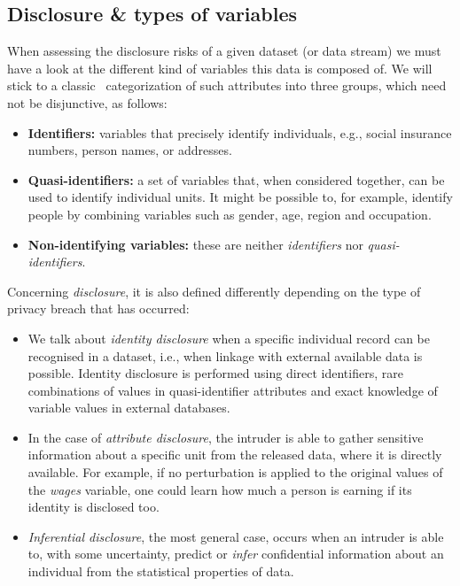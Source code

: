 \subsection{Disclosure \& types of variables}

When assessing the disclosure risks of a given dataset (or data stream) we must have a look at the different kind of variables this data is composed of. We will stick to a classic~\citep{Templ:IntroSDC} categorization of such attributes into three groups, which need not be disjunctive, as follows:

\begin{itemize}
	\item \textbf{Identifiers:} variables that precisely identify individuals, e.g., social insurance numbers, person names, or addresses.
	\item \textbf{Quasi-identifiers:} a set of variables that, when considered together, can be used to identify individual units. It might be possible to, for example, identify people by combining variables such as gender, age, region and occupation.
	\item \textbf{Non-identifying variables:} these are neither \textit{identifiers} nor \textit{quasi-identifiers}.
\end{itemize}

Concerning \textit{disclosure}, it is also defined differently depending on the type of privacy breach that has occurred:

\begin{itemize}
	\item We talk about \textit{identity disclosure} when a specific individual record can be recognised in a dataset, i.e., when linkage with external available data is possible. Identity disclosure is performed using direct identifiers, rare combinations of values in quasi-identifier attributes and exact knowledge of variable values in external databases.
	\item In the case of \textit{attribute disclosure}, the intruder is able to gather sensitive information about a specific unit from the released data, where it is directly available. For example, if no perturbation is applied to the original values of the \textit{wages} variable, one could learn how much a person is earning if its identity is disclosed too.
	\item \textit{Inferential disclosure}, the most general case, occurs when an intruder is able to, with some uncertainty, predict or \textit{infer} confidential information about an individual from the statistical properties of data.
\end{itemize}

